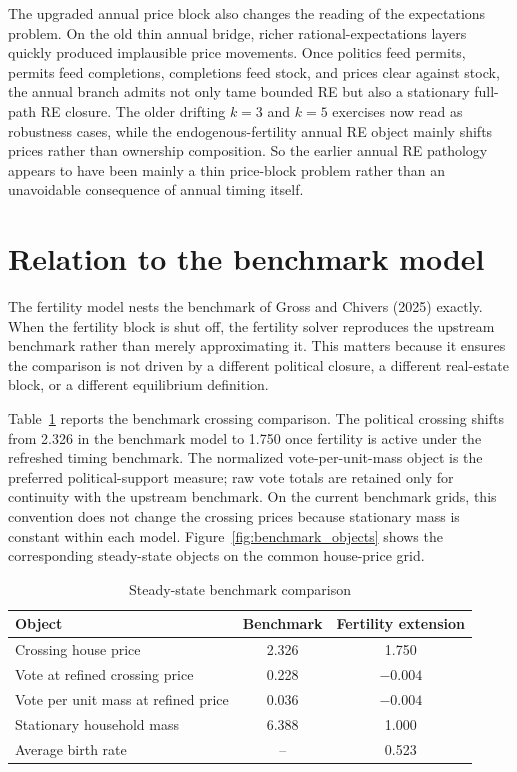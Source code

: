 \documentclass[11pt]{article}
\begin{document}
The upgraded annual price block also changes the reading of the expectations problem. On the
old thin annual bridge, richer rational-expectations layers quickly produced implausible
price movements. Once politics feed permits, permits feed completions, completions feed stock,
and prices clear against stock, the annual branch admits not only tame bounded RE but also a
stationary full-path RE closure. The older drifting $k=3$ and $k=5$ exercises now read as
robustness cases, while the endogenous-fertility annual RE object mainly shifts prices rather
than ownership composition. So the earlier annual RE pathology appears to have been mainly a
thin price-block problem rather than an unavoidable consequence of annual timing itself.

\appendix

\section{Relation to the benchmark model}

The fertility model nests the benchmark of Gross and Chivers (2025) exactly. When the
fertility block is shut off, the fertility solver reproduces the upstream benchmark rather
than merely approximating it. This matters because it ensures the comparison is not driven by
a different political closure, a different real-estate block, or a different equilibrium
definition.

Table~\ref{tab:benchmark} reports the benchmark crossing comparison. The political crossing
shifts from 2.326 in the benchmark model to 1.750 once fertility is active under the
refreshed timing benchmark. The normalized vote-per-unit-mass object is the preferred
political-support measure; raw vote totals are retained only for continuity with the
upstream benchmark. On the current benchmark grids, this convention does not change the
crossing prices because stationary mass is constant within each model.
Figure~\ref{fig:benchmark_objects} shows the corresponding steady-state objects on the common
house-price grid.

\begin{table}[htbp]
\centering
\caption{Steady-state benchmark comparison}
\label{tab:benchmark}
\begin{tabular}{lcc}
\toprule
Object & Benchmark & Fertility extension \\
\midrule
Crossing house price & 2.326 & 1.750 \\
Vote at refined crossing price & 0.228 & $-0.004$ \\
Vote per unit mass at refined price & 0.036 & $-0.004$ \\
Stationary household mass & 6.388 & 1.000 \\
Average birth rate & -- & 0.523 \\
\bottomrule
\end{tabular}
\end{table}
\end{document}
